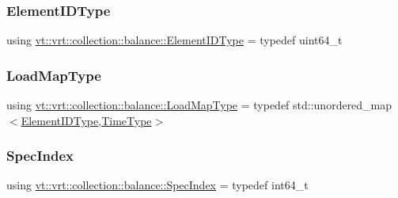 \mbox{\label{namespacevt_1_1vrt_1_1collection_1_1balance_a14c8d2c972f2913aa3f1636e5be0a120}} 
\subsubsection{\texorpdfstring{Element\+I\+D\+Type}{ElementIDType}}
{\footnotesize\ttfamily using \hyperlink{namespacevt_1_1vrt_1_1collection_1_1balance_a14c8d2c972f2913aa3f1636e5be0a120}{vt\+::vrt\+::collection\+::balance\+::\+Element\+I\+D\+Type} = typedef uint64\+\_\+t}

\mbox{\label{namespacevt_1_1vrt_1_1collection_1_1balance_a45306ee4bf38fe3fb586d1ee2fa3d147}} 
\subsubsection{\texorpdfstring{Load\+Map\+Type}{LoadMapType}}
{\footnotesize\ttfamily using \hyperlink{namespacevt_1_1vrt_1_1collection_1_1balance_a45306ee4bf38fe3fb586d1ee2fa3d147}{vt\+::vrt\+::collection\+::balance\+::\+Load\+Map\+Type} = typedef std\+::unordered\+\_\+map$<$\hyperlink{namespacevt_1_1vrt_1_1collection_1_1balance_a14c8d2c972f2913aa3f1636e5be0a120}{Element\+I\+D\+Type},\hyperlink{namespacevt_a876a9d0cd5a952859c72de8a46881442}{Time\+Type}$>$}

\mbox{\label{namespacevt_1_1vrt_1_1collection_1_1balance_a72a5e0d9936ddf57f8e6c64e0e9fd123}} 
\subsubsection{\texorpdfstring{Spec\+Index}{SpecIndex}}
{\footnotesize\ttfamily using \hyperlink{namespacevt_1_1vrt_1_1collection_1_1balance_a72a5e0d9936ddf57f8e6c64e0e9fd123}{vt\+::vrt\+::collection\+::balance\+::\+Spec\+Index} = typedef int64\+\_\+t}

